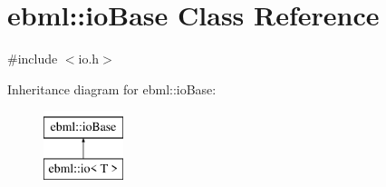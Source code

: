 \hypertarget{classebml_1_1ioBase}{}\section{ebml\+:\+:io\+Base Class Reference}
\label{classebml_1_1ioBase}


{\ttfamily \#include $<$io.\+h$>$}

Inheritance diagram for ebml\+:\+:io\+Base\+:\begin{figure}[H]
\begin{center}
\leavevmode
\includegraphics[height=2.000000cm]{classebml_1_1ioBase}
\end{center}
\end{figure}
